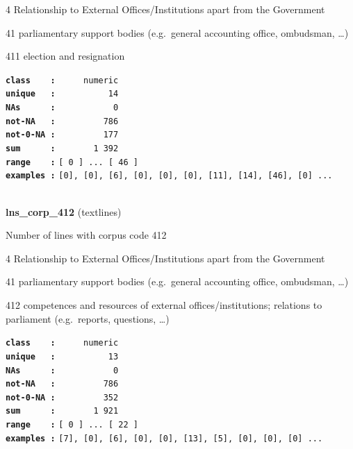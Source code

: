 \documentclass[]{article}
\begin{document}
4 Relationship to External Offices/Institutions apart from the
Government

41 parliamentary support bodies (e.g.~general accounting office,
ombudsman, \ldots{})

411 election and resignation

\textbf{\texttt{class\ \ \ \ :}} \texttt{~~~~~numeric}\\
\textbf{\texttt{unique\ \ \ :}} \texttt{~~~~~~~~~~14}\\
\textbf{\texttt{NAs\ \ \ \ \ \ :}} \texttt{~~~~~~~~~~~0}\\
\textbf{\texttt{not-NA\ \ \ :}} \texttt{~~~~~~~~~786}\\
\textbf{\texttt{not-0-NA\ :}} \texttt{~~~~~~~~~177}\\
\textbf{\texttt{sum\ \ \ \ \ \ :}} \texttt{~~~~~~~1~392}\\
\textbf{\texttt{range\ \ \ \ :}}
\texttt{{[}\ 0\ {]}\ ...\ {[}\ 46\ {]}}\\
\textbf{\texttt{examples\ :}}
\texttt{{[}0{]},\ {[}0{]},\ {[}6{]},\ {[}0{]},\ {[}0{]},\ {[}0{]},\ {[}11{]},\ {[}14{]},\ {[}46{]},\ {[}0{]}\ ...}\\

~

\textbf{lns\_corp\_412} (textlines)

Number of lines with corpus code 412

4 Relationship to External Offices/Institutions apart from the
Government

41 parliamentary support bodies (e.g.~general accounting office,
ombudsman, \ldots{})

412 competences and resources of external offices/institutions;
relations to parliament (e.g.~reports, questions, \ldots{})

\textbf{\texttt{class\ \ \ \ :}} \texttt{~~~~~numeric}\\
\textbf{\texttt{unique\ \ \ :}} \texttt{~~~~~~~~~~13}\\
\textbf{\texttt{NAs\ \ \ \ \ \ :}} \texttt{~~~~~~~~~~~0}\\
\textbf{\texttt{not-NA\ \ \ :}} \texttt{~~~~~~~~~786}\\
\textbf{\texttt{not-0-NA\ :}} \texttt{~~~~~~~~~352}\\
\textbf{\texttt{sum\ \ \ \ \ \ :}} \texttt{~~~~~~~1~921}\\
\textbf{\texttt{range\ \ \ \ :}}
\texttt{{[}\ 0\ {]}\ ...\ {[}\ 22\ {]}}\\
\textbf{\texttt{examples\ :}}
\texttt{{[}7{]},\ {[}0{]},\ {[}6{]},\ {[}0{]},\ {[}0{]},\ {[}13{]},\ {[}5{]},\ {[}0{]},\ {[}0{]},\ {[}0{]}\ ...}\\
\end{document}
